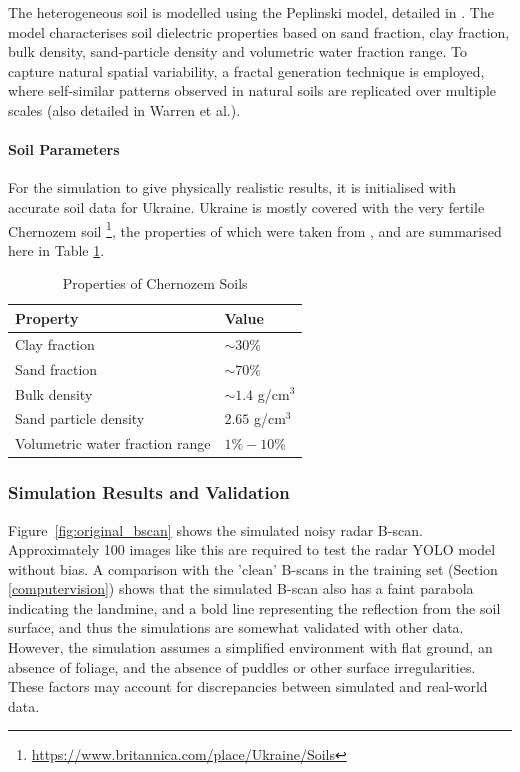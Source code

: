         \noindent The heterogeneous soil is modelled using the Peplinski model, detailed in \cite{warren2016gprmax}. The model characterises soil dielectric properties based on sand fraction, clay fraction, bulk density, sand-particle density and volumetric water fraction range. To capture natural spatial variability, a fractal generation technique is employed, where self-similar patterns observed in natural soils are replicated over multiple scales (also detailed in Warren et al.).

        \paragraph{Soil Parameters}

            For the simulation to give physically realistic results, it is initialised with accurate soil data for Ukraine. Ukraine is mostly covered with the very fertile Chernozem soil \footnote{\url{https://www.britannica.com/place/Ukraine/Soils}}, the properties of which were taken from \cite{suleymanov2021chernozem}, and are summarised here in Table \ref{tab:chernozem}.

            \begin{table}[htbp]
              \centering
              \caption{Properties of Chernozem Soils}
              \begin{tabular}{@{} l l @{}} 
                \toprule
                \textbf{Property} & \textbf{Value} \\
                \midrule
                Clay fraction & $\sim 30\%$ \\
                Sand fraction & $\sim 70\%$ \\
                Bulk density & $\sim 1.4$ g/cm$^3$ \\
                Sand particle density & $2.65$ g/cm$^3$ \\
                Volumetric water fraction range & $1\% - 10\%$ \\
                \bottomrule
              \end{tabular}
              \label{tab:chernozem}
            \end{table}
    

    
    \subsubsection{Simulation Results and Validation}

        \noindent Figure~\ref{fig:original_bscan} shows the simulated noisy radar B-scan. Approximately 100 images like this are required to test the radar YOLO model without bias. A comparison with the 'clean' B-scans in the training set (Section \ref{computervision}) shows that the simulated B-scan also has a faint parabola indicating the landmine, and a bold line representing the reflection from the soil surface, and thus the simulations are somewhat validated with other data. However, the simulation assumes a simplified environment with flat ground, an absence of foliage, and the absence of puddles or other surface irregularities. These factors may account for discrepancies between simulated and real-world data.

